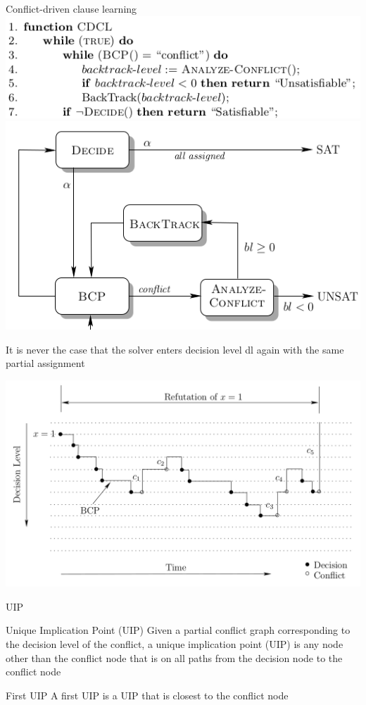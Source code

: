 \documentclass{beamer}
\begin{document}
\begin{frame}{Conflict-driven clause learning}
\includegraphics[scale=0.4]{CDCL.png}
\includegraphics[scale=0.4]{CDCL_scheme.png}
\begin{block}{}
It is never the case that the solver enters decision level dl again with the same partial assignment
\end{block}
\end{frame}

\begin{frame}{}
\includegraphics[scale=0.25]{Graph.png}
\end{frame}

\begin{frame}{UIP}
\begin{block}{Unique Implication Point (UIP)}
Given a partial conflict graph corresponding to the decision level of the conflict, a unique implication point (UIP) is any node other than the conflict node that is on all paths from the decision node to the conflict node
\end{block}
\begin{block}{First UIP}
A first UIP is a UIP that is closest to the conflict node
\end{block}
\end{frame}
\end{document}
